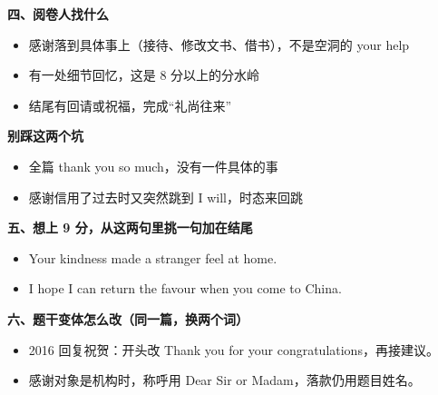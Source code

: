 \documentclass[11pt,a4paper]{ctexart}
\begin{document}
\vspace{5pt}
\noindent\begin{minipage}[t]{0.555\linewidth}
{\color{accent}\bfseries 四、阅卷人找什么}\par
{\footnotesize\begin{itemize}[leftmargin=1.2em,itemsep=1pt,topsep=1pt,parsep=0pt]\setlength{\leftmargin}{1.1em}
\item 感谢落到具体事上（接待、修改文书、借书），不是空洞的 your help
\item 有一处细节回忆，这是 8 分以上的分水岭
\item 结尾有回请或祝福，完成“礼尚往来”
\end{itemize}}
\end{minipage}\hfill
\begin{minipage}[t]{0.415\linewidth}
{\color{hot}\bfseries 别踩这两个坑}\par
{\footnotesize\begin{itemize}[leftmargin=1.2em,itemsep=1pt,topsep=1pt,parsep=0pt]\setlength{\leftmargin}{1.1em}
\item 全篇 thank you so much，没有一件具体的事
\item 感谢信用了过去时又突然跳到 I will，时态来回跳
\end{itemize}}
\end{minipage}\par

\vspace{6pt}
{\color{accent}\bfseries 五、想上 9 分，从这两句里挑一句加在结尾}\par
\vspace{2pt}
{\footnotesize
\begin{itemize}[leftmargin=1.2em,itemsep=1.5pt,topsep=1pt,parsep=0pt]
\item Your kindness made a stranger feel at home.
\item I hope I can return the favour when you come to China.
\end{itemize}}\par

\vspace{6pt}
{\color{accent}\bfseries 六、题干变体怎么改（同一篇，换两个词）}\par
\vspace{2pt}
{\footnotesize
\begin{itemize}[leftmargin=1.2em,itemsep=1.5pt,topsep=1pt,parsep=0pt]
\item 2016 回复祝贺：开头改 Thank you for your congratulations，再接建议。
\item 感谢对象是机构时，称呼用 Dear Sir or Madam，落款仍用题目姓名。
\end{itemize}}\par
\end{document}
